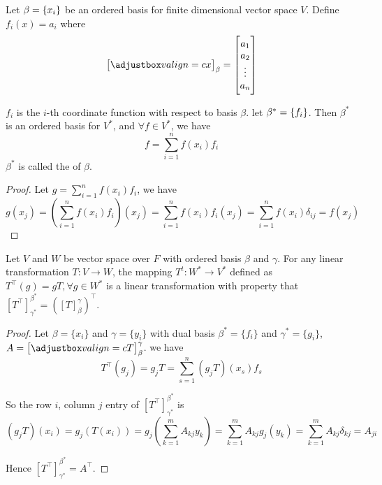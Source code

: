 \begin{definition}
	Let $\beta = \set{x_i}$ be an ordered basis for finite dimensional vector space $V$. Define $f_i (x) = a_i$ where
	\begin{equation*}
	    \coordinate{x}_\beta = \begin{bmatrix}
	        a_1 \\
	        a_2 \\
	        \vdots \\
	        a_n
	    \end{bmatrix}
	\end{equation*}
	
	$f_i$ is the $i$-th coordinate function with respect to basis $\beta$. let $\beta^*=\set{f_i}$. Then $\beta^*$ is an ordered basis for $V^*$, and $\forall f \in V^*$, we have
	\begin{equation}
		f = \sum_{i=1}^n f(x_i) f_i
	\end{equation}
	$\beta^*$ is called the  of $\beta$.
\end{definition}
\begin{proof}
	Let $g =\displaystyle \sum_{i=1}^n f(x_i) f_i$, we have
	\begin{equation*}
	g(x_j) = \left( \sum_{i=1}^n f(x_i) f_i \right) (x_j) = \sum_{i=1}^n f(x_i) f_i (x_j) = \sum_{i=1}^n f(x_i) \delta_{ij} =f(x_j)
	\end{equation*}
\end{proof}


\begin{theorem}
	Let $V$ and $W$ be vector space over $F$ with ordered basis $\beta$ and $\gamma$. For any linear transformation $T:V \rightarrow W$, the mapping $T^t: W^* \rightarrow V^*$ defined as $T^\top (g) = gT, \forall g \in W^*$ is a linear transformation with property that $\left[T^\top \right]_{\gamma^*}^{\beta^*} = \left(\left[T \right]_\beta^\gamma \right)^\top$.
\end{theorem}
\begin{proof}
	Let $\beta = \{x_i\}$ and $\gamma=\{y_i\}$ with dual basis $\beta^*=\{f_i\}$ and $\gamma^*=\{g_i\}$, $A=\coordinate{T}_\beta^\gamma$. we have
	\begin{equation*}
		T^\top (g_j) = g_j T = \sum_{s=1}^n (g_j T) (x_s) f_s
	\end{equation*}
	
	So the row $i$, column $j$ entry of $[T^\top]_{\gamma^*}^{\beta^*}$ is
	\begin{equation*}
	(g_j T)(x_i) = g_j (T(x_i))= g_j \left( \sum_{k=1}^m A_{kj} y_k \right) = \sum_{k=1}^m A_{kj} g_j(y_k)= \sum_{k=1}^m A_{kj} \delta_{kj} = A_{ji}
	\end{equation*}
	
	Hence $\left[T^\top \right]_{\gamma^*}^{\beta^*} = A^\top $.
\end{proof}

